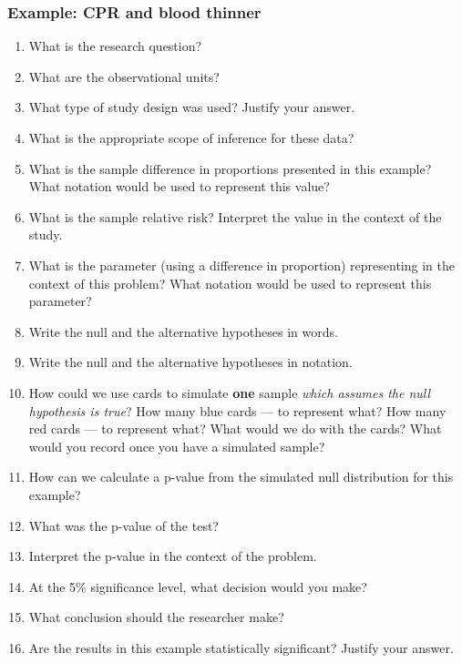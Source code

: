 \documentclass[
]{report}
\newcommand{\rgs}{\vspace{12pt}} %
\begin{document}
\hypertarget{example-cpr-and-blood-thinner}{%
\subsubsection*{Example: CPR and blood thinner}\label{example-cpr-and-blood-thinner}}

\begin{enumerate}
\def\labelenumi{\arabic{enumi}.}
\item
  What is the research question?
  \rgs
\item
  What are the observational units?
  \rgs
\item
  What type of study design was used? Justify your answer.
  \rgs
\item
  What is the appropriate scope of inference for these data?
  \rgs
\item
  What is the sample difference in proportions presented in this example? What notation would be used to represent this value?
  \rgs
\item
  What is the sample relative risk? Interpret the value in the context of the study.
  \rgs
  \rgs
\item
  What is the parameter (using a difference in proportion) representing in the context of this problem? What notation would be used to represent this parameter?
  \rgs
  \rgs
\item
  Write the null and the alternative hypotheses in words.
  \rgs
  \rgs
\item
  Write the null and the alternative hypotheses in notation.
  \rgs
\item
  How could we use cards to simulate \textbf{one} sample \emph{which assumes the null hypothesis is true}? How many blue cards --- to represent what? How many red cards --- to represent what? What would we do with the cards? What would you record once you have a simulated sample?
  \rgs
  \rgs
  \rgs
\item
  How can we calculate a p-value from the simulated null distribution for this example?
  \rgs
  \rgs
\item
  What was the p-value of the test?
  \rgs
\item
  Interpret the p-value in the context of the problem.
  \rgs
  \rgs
\item
  At the 5\% significance level, what decision would you make?
  \rgs
\item
  What conclusion should the researcher make?
  \rgs
  \rgs
\item
  Are the results in this example statistically significant? Justify your answer.
  \rgs
\end{enumerate}
\end{document}
